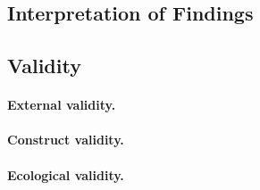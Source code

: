 \documentclass[sigconf,nonacm]{acmart}
\begin{document}
\subsection{Interpretation of Findings}

\subsection{Validity}

\paragraph{External validity.}

\paragraph{Construct validity.}

\paragraph{Ecological validity.}
\end{document}
